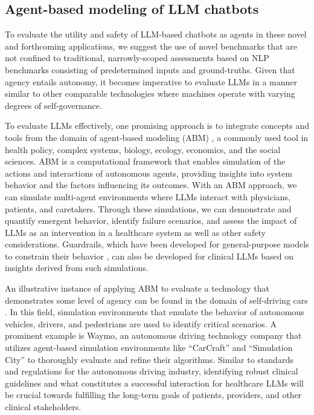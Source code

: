 \documentclass[10pt]{article}
\begin{document}
\begin{multicols}{2}
\section{Agent-based modeling of LLM chatbots}
\label{sec:headings}
To evaluate the utility and safety of LLM-based chatbots as agents in these novel and forthcoming applications, we suggest the use of novel benchmarks that are not confined to traditional, narrowly-scoped assessments based on NLP benchmarks consisting of predetermined inputs and ground-truths. Given that agency entails autonomy, it becomes imperative to evaluate LLMs in a manner similar to other comparable technologies where machines operate with varying degrees of self-governance.  

To evaluate LLMs effectively, one promising approach is to integrate concepts and tools from the domain of agent-based modeling (ABM) \cite{bankes2002agent}, a commonly used tool in health policy, complex systems, biology, ecology, economics, and the social sciences. ABM is a computational framework that enables simulation of the actions and interactions of autonomous agents, providing insights into system behavior and the factors influencing its outcomes. With an ABM approach, we can simulate multi-agent environments where LLMs interact with physicians, patients, and caretakers. Through these simulations, we can demonstrate and quantify emergent behavior, identify failure scenarios, and assess the impact of LLMs as an intervention in a healthcare system as well as other safety considerations. Guardrails, which have been developed for general-purpose models to constrain their behavior \cite{nvidia}, can also be developed for clinical LLMs based on insights derived from such simulations.  

An illustrative instance of applying ABM to evaluate a technology that demonstrates some level of agency can be found in the domain of self-driving cars \cite{fagnant2014travel}.  In this field, simulation environments that emulate the behavior of autonomous vehicles, drivers, and pedestrians are used to identify critical scenarios. A prominent example is Waymo, an autonomous driving technology company that utilizes agent-based simulation environments like “CarCraft” \cite{waymo1} and “Simulation City” \cite{waymo2} to thoroughly evaluate and refine their algorithms. Similar to standards and regulations for the autonomous driving industry, identifying robust clinical guidelines and what constitutes a successful interaction for healthcare LLMs will be crucial towards fulfilling the long-term goals of patients, providers, and other clinical stakeholders.


\end{multicols}
\end{document}
